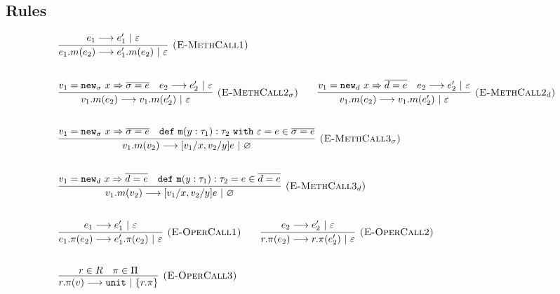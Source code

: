 \documentclass{llncs}
\newcommand{\keywadj}[1]{\mathtt{#1}}
\newcommand{\keyw}[1]{\keywadj{#1}~}
\begin{document}
\subsection{Rules}




\[
\begin{array}{lll}

	\infer[\textsc{(E-MethCall1)}]
		{e_1.m(e_2) \longrightarrow e_1'.m(e_2)~|~\varepsilon}
		{e_1 \longrightarrow e_1'~|~\varepsilon}\\[5ex]

	\infer[\textsc{(E-MethCall2$_{\sigma}$)}]
		{v_1.m(e_2) \longrightarrow v_1.m(e_2')~|~\varepsilon}
		{v_1 = \keywadj{new}_{\sigma}~x \Rightarrow \overline{\sigma = e} & e_2 \longrightarrow e_2'~|~\varepsilon}
				
		~~~~~~
	\infer[\textsc{(E-MethCall2$_d$)}]
		{v_1.m(e_2) \longrightarrow v_1.m(e_2')~|~\varepsilon}
		{v_1 = \keywadj{new}_{d}~x \Rightarrow \overline{d = e} & e_2 \longrightarrow e_2'~|~\varepsilon}
		\\[5ex]
		
	\infer[\textsc{(E-MethCall3$_{\sigma}$)}]
		{v_1.m(v_2)
			\longrightarrow
		 [v_1/x, v_2/y]e~|~\varnothing}
  		{v_1 = \keywadj{new}_{\sigma}~x \Rightarrow \overline{\sigma = e} & \keywadj{def~m}(y: \tau_1) : \tau_2~\keyw{with} \varepsilon = e \in \overline {\sigma = e}} \\[5ex]

	\infer[\textsc{(E-MethCall3$_{d}$)}]
		{v_1.m(v_2)
			\longrightarrow
		 [v_1/x, v_2/y]e~|~\varnothing}
  		{v_1 = \keywadj{new}_{d}~x \Rightarrow \overline{d = e} & \keywadj{def~m}(y: \tau_1) : \tau_2 = e \in \overline {d = e}} \\[5ex]
			
	\infer[\textsc{(E-OperCall1)}]
		{e_1.\pi(e_2)
			\longrightarrow
		 e_1'.\pi(e_2)~|~\varepsilon}
		{e_1 \longrightarrow e_1'~|~\varepsilon}
~~~~~~
			\infer[\textsc{(E-OperCall2)}]
		{r.\pi(e_2)
			\longrightarrow
		 r.\pi(e_2')~|~\varepsilon}
		{e_2 \longrightarrow e_2'~|~\varepsilon} \\[5ex]
			
			\infer[\textsc{(E-OperCall3)}]
		{r.\pi(v)
			\longrightarrow
		 \keywadj{unit}~|~\{r.\pi\}}
		{r \in R & \pi \in \Pi} \\[5ex]
			
\end{array}
\]



\end{document}
